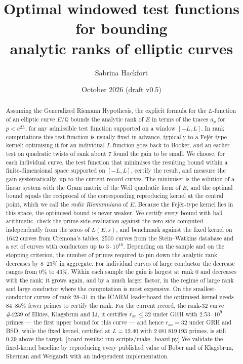 \documentclass[11pt]{amsart}
\title[Optimal windowed test functions for analytic rank bounds]{Optimal windowed test functions for bounding\\ analytic ranks of elliptic curves}
\author{Sabrina Hackfort}
\date{October 2026 \quad (draft v0.5)}
\theoremstyle{remark}
\theoremstyle{definition}
\newcommand{\Q}{\mathbb{Q}}
\newcommand{\ran}{r_{\mathrm{an}}}
\newcommand{\BoardAbstract}{[board results: run scripts/make\_board.py]}%
\begin{document}
\begin{abstract}
Assuming the Generalized Riemann Hypothesis, the explicit formula for the $L$-function of an elliptic curve $E/\Q$ bounds the analytic rank of $E$ in terms of the traces $a_p$ for $p < e^{2L}$, for any admissible test function supported on a window $[-L,L]$. In rank computations this test function is usually fixed in advance, typically to a Fej\'er-type kernel; optimising it for an individual $L$-function goes back to Booker, and an earlier test on quadratic twists of rank about $7$ found the gain to be small. We choose, for each individual curve, the test function that minimises the resulting bound within a finite-dimensional space supported on $[-L,L]$, certify the result, and measure the gain systematically, up to the current record curves. The minimiser is the solution of a linear system with the Gram matrix of the Weil quadratic form of $E$, and the optimal bound equals the reciprocal of the corresponding reproducing kernel at the central point, which we call the \emph{radix Riemanniana} of $E$. Because the Fej\'er-type kernel lies in this space, the optimised bound is never weaker. We certify every bound with ball arithmetic, check the prime-side evaluation against the zero side computed independently from the zeros of $L(E,s)$, and benchmark against the fixed kernel on $1642$ curves from Cremona's tables, $2500$ curves from the Stein--Watkins database and a set of curves with conductors up to $3\cdot 10^{16}$. Depending on the sample and on the stopping criterion, the number of primes required to pin down the analytic rank decreases by $8$--$23\%$ in aggregate. For individual curves of large conductor the decrease ranges from $0\%$ to $43\%$. Within each sample the gain is largest at rank $0$ and decreases with the rank; it grows again, and by a much larger factor, in the regime of large rank and large conductor where the computation is most expensive. On the smallest-conductor curves of rank $28$--$31$ in the ICARM leaderboard the optimised kernel needs $84$--$85\%$ fewer primes to certify the rank. For the current record, the rank-$32$ curve \#4239 of Elkies, Klagsbrun and Li, it certifies $\ran\le32$ under GRH with $2.53\cdot10^{9}$ primes --- the first upper bound for this curve --- and hence $\ran=32$ under GRH and BSD, while the fixed kernel, certified at $L=12.40$ with $2\,481\,819\,193$ primes, is still $0.39$ above the target. \BoardAbstract{} We validate the fixed-kernel baseline by reproducing every published value of Bober and of Klagsbrun, Sherman and Weigandt with an independent implementation.
\end{abstract}
\end{document}
